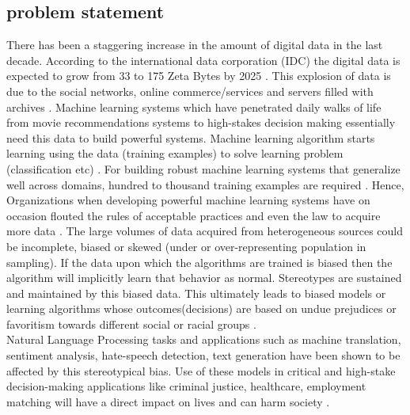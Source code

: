 \subsection{problem statement}
There has been a staggering increase in the amount of digital data in the last decade. According to the international data corporation (IDC) the digital data is expected to grow from 33 to 175 Zeta Bytes by 2025 \cite{IDC}. This explosion of data is due to the social networks, online commerce/services and servers filled with archives \cite{IDC}. Machine learning systems which have penetrated daily walks of life from movie recommendations systems to high-stakes decision making essentially need this data to build powerful systems. Machine learning algorithm starts learning using the data (training examples) to solve learning problem (classification etc) \cite{jordan2015machine}. For building robust machine learning systems that generalize well across domains, hundred to thousand training examples are required \cite{radford2019language}. Hence, Organizations when developing powerful machine learning systems have on occasion flouted the rules of acceptable practices and even the law to acquire more data \cite{lloyd2018bias}. The large volumes of data acquired from heterogeneous sources could be incomplete, biased or skewed (under or over-representing population in sampling)\cite{campolo2017ai}. If the data upon which the algorithms are trained is biased then the algorithm will implicitly learn that behavior as normal\cite{lloyd2018bias}. Stereotypes are sustained and maintained by this biased data. This ultimately leads to biased models or learning algorithms whose outcomes(decisions) are based on undue prejudices or favoritism towards different social or racial groups \cite{mehrabi2019survey}. 
\\
Natural Language Processing tasks and applications such as machine translation, sentiment analysis, hate-speech detection, text generation \cite{blodgett2020language} have been shown to be affected by this stereotypical bias. Use of these models in critical and high-stake decision-making applications like criminal justice, healthcare, employment matching will have a direct impact on lives and can harm society \cite{mehrabi2019survey}.
\\
